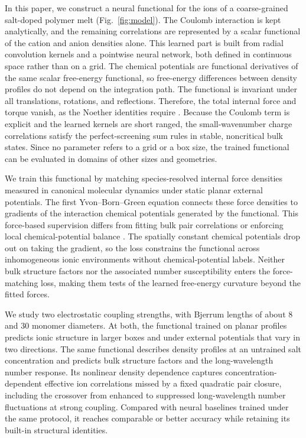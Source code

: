 In this paper, we construct a neural functional for the ions of a coarse-grained salt-doped polymer melt \cite{tsamopoulos2024ion} (Fig.~\ref{fig:model}). The Coulomb interaction is kept analytically, and the remaining correlations are represented by a scalar functional of the cation and anion densities alone. This learned part is built from radial convolution kernels and a pointwise neural network, both defined in continuous space rather than on a grid. The chemical potentials are functional derivatives of the same scalar free-energy functional, so free-energy differences between density profiles do not depend on the integration path. The functional is invariant under all translations, rotations, and reflections. Therefore, the total internal force and torque vanish, as the Noether identities require \cite{hermann2021noether}. Because the Coulomb term is explicit and the learned kernels are short ranged, the small-wavenumber charge correlations satisfy the perfect-screening sum rules \cite{stillinger1968general} in stable, noncritical bulk states. Since no parameter refers to a grid or a box size, the trained functional can be evaluated in domains of other sizes and geometries.
 

We train this functional by matching species-resolved internal force densities measured in canonical molecular dynamics under static planar external potentials. The first Yvon--Born--Green equation connects these force densities to gradients of the interaction chemical potentials generated by the functional. This force-based supervision differs from fitting bulk pair correlations \cite{dijkman2025learning} or enforcing local chemical-potential balance \cite{sammuller2026determining,cheng2026equivariant}. The spatially constant chemical potentials drop out on taking the gradient, so the loss constrains the functional across inhomogeneous ionic environments without chemical-potential labels. Neither bulk structure factors nor the associated number susceptibility enters the force-matching loss, making them tests of the learned free-energy curvature beyond the fitted forces.

We study two electrostatic coupling strengths, with Bjerrum lengths of about $8$ and $30$ monomer diameters. At both, the functional trained on planar profiles predicts ionic structure in larger boxes and under external potentials that vary in two directions. The same functional describes density profiles at an untrained salt concentration and predicts bulk structure factors and the long-wavelength number response. Its nonlinear density dependence captures concentration-dependent effective ion correlations missed by a fixed quadratic pair closure, including the crossover from enhanced to suppressed long-wavelength number fluctuations at strong coupling. Compared with neural baselines trained under the same protocol, it reaches comparable or better accuracy while retaining its built-in structural identities.
